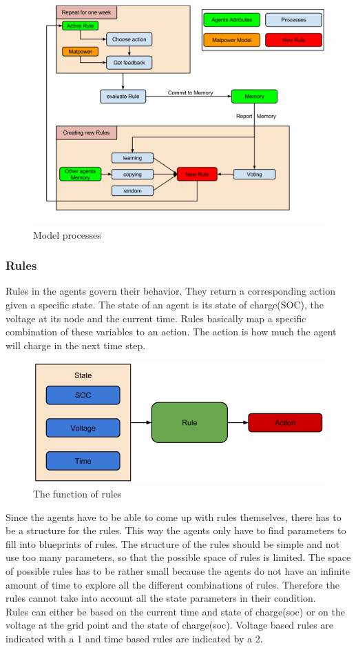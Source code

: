 \documentclass[a4paper]{article}
\begin{document}
\begin{figure}[!ht]
\includegraphics[width =\textwidth]{concept_coffe.png}
\caption{Model processes}
\label{model_coffee}
\end{figure}


\clearpage
\subsubsection{Rules}
Rules in the agents govern their behavior. They return a corresponding action given a specific state. The state of
an agent is its state of charge(SOC), the voltage at its node and the current time. Rules basically map a specific 
combination of these variables to an action. The action is how much the agent will charge in the next time step. 
\begin{figure}[!ht]
\includegraphics[width =\textwidth]{concept_rules_function.png}
\caption{The function of rules}
\label{rules_function}
\end{figure}
Since the agents have to be able to come up with rules themselves, there has to be a structure for the rules. This 
way the agents only have to find parameters to fill into blueprints of rules. The structure of the rules should be simple and not 
use too many parameters, so that the possible space of rules is limited. The space of possible rules has to be rather small 
because the agents do not have an infinite amount of time to explore all the different combinations of rules. Therefore 
the rules cannot take into account all the state parameters in their condition. \\
Rules can either be based on the current time and state of charge(soc) or on the voltage at the grid point and 
the state of charge(soc). Voltage based rules are indicated with a 1 and time based rules are indicated by a 2.
\end{document}
